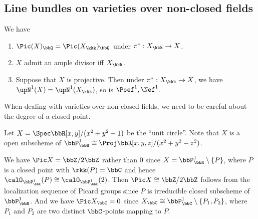 \subsection{Line bundles on varieties over non-closed fields}



  \begin{proposition}


    We have 
    \begin{enumerate}
      \item $\Pic(X)_\bbQ = \Pic(X_\kkk)_\bbQ$ under $\pi^*: X_\kkk \to X$.
      \item $X$ admit an ample divisor iff $X_\kkk$.
      \item Suppose that $X$ is projective.
        Then under $\pi^*: X_\kkk \to X$, we have $\upN^1(X) = \upN^1(X_\kkk)$, so is $\Psef^1, \Nef^1$.
    \end{enumerate}
    
    
    \Yang{}
  \end{proposition}

  
  When dealing with varieties over non-closed fields, we need to be careful about the degree of a closed point.

  \begin{example}
    Let $X = \Spec \bbR[x, y]/(x^2 + y^2 - 1)$ be the ``unit circle''.
    Note that $X$ is a open subscheme of $\bbP^1_\bbR \cong \Proj \bbR[x,y,z]/(x^2 + y^2 - z^2)$.
    
    We have $\Pic X = \bbZ/2\bbZ$ rather than $0$ since $X = \bbP^1_\bbR \setminus \{P\}$, where $P$ is a closed point with $\rkk(P) = \bbC$ and hence $\calO_{\bbP^1_\bbR}(P) \cong \calO_{\bbP^1_\bbR}(2)$.
    Then $\Pic X \cong \bbZ/2\bbZ$ follows from the localization sequence of Picard groups since $P$ is irreducible closed subscheme of $\bbP^1_\bbR$.
    And we have $\Pic X_\bbC = 0$ since $X_\bbC \cong \bbP^1_\bbC \setminus \{P_1, P_2\}$, where $P_1$ and $P_2$ are two distinct $\bbC$-points mapping to $P$.
  \end{example}










